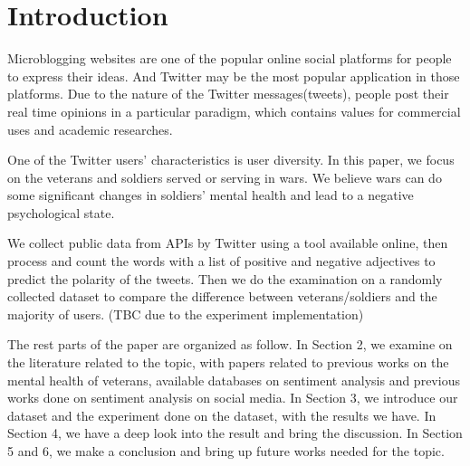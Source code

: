 \section{Introduction}

Microblogging websites are one of the popular online social platforms for people
to express their ideas. And Twitter may be the most popular application in those
platforms. Due to the nature of the Twitter messages(tweets), people post their
real time opinions in a particular paradigm, which contains values for
commercial uses and academic researches.

One of the Twitter users' characteristics is user diversity. In this paper,
we focus on the veterans and soldiers served or serving in wars. We believe wars
can do some significant changes in soldiers' mental health and lead to a negative
psychological state.

We collect public data from APIs by Twitter using a tool available online, then
process and count the words with a list of positive and negative adjectives to
predict the polarity of the tweets. Then we do the examination on a randomly
collected dataset to compare the difference between veterans/soldiers and the
majority of users.
(TBC due to the experiment implementation)

The rest parts of the paper are organized as follow. In Section 2, we examine on
the literature related to the topic, with papers related to previous works on the
mental health of veterans, available databases on sentiment analysis and
previous works done on sentiment analysis on social media. In Section 3, we
introduce our dataset and the experiment done on the dataset, with the results
we have. In Section 4, we have a deep look into the result and bring the
discussion. In Section 5 and 6, we make a conclusion and bring up future works
needed for the topic.
